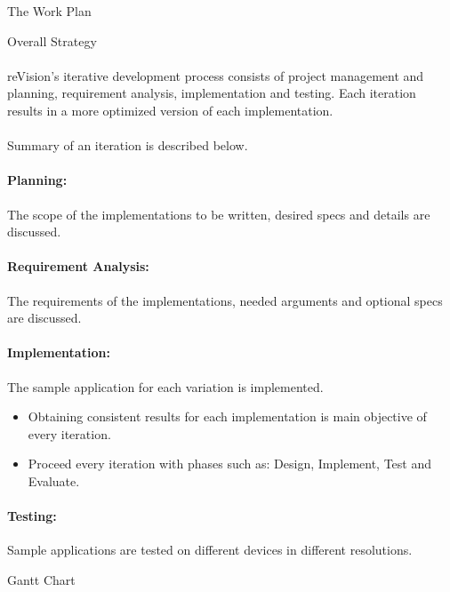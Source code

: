 \documentclass[12pt, a4paper]{article} \pagenumbering{gobble}
\begin{document}
\begin{section}{The Work Plan}
  \begin{subsection}{Overall Strategy}
    \paragraph{}{reVision's iterative development process consists of project management and planning, requirement analysis,
    implementation and testing. Each iteration results in a more optimized version of each implementation.}\\ \\
    Summary of an iteration is described below.
    \paragraph{Planning:}{The scope of the implementations to be written, desired specs and details are discussed.}
    \paragraph{Requirement Analysis:}{The requirements of the implementations, needed arguments and optional specs are discussed.}
    \paragraph{Implementation:}{The sample application for each variation is implemented.
      \begin{itemize}
        \item Obtaining consistent results for each implementation is main objective of every iteration.
        \item Proceed every iteration with phases such as: Design, Implement, Test and Evaluate.
      \end{itemize}
    }
    \paragraph{Testing:}{Sample applications are tested on different devices in different resolutions.}
  \end{subsection}

  \newpage

  \begin{subsection}{Gantt Chart}

  \begin{centering}
\end{centering}
\end{subsection}
\end{section}
\end{document}
